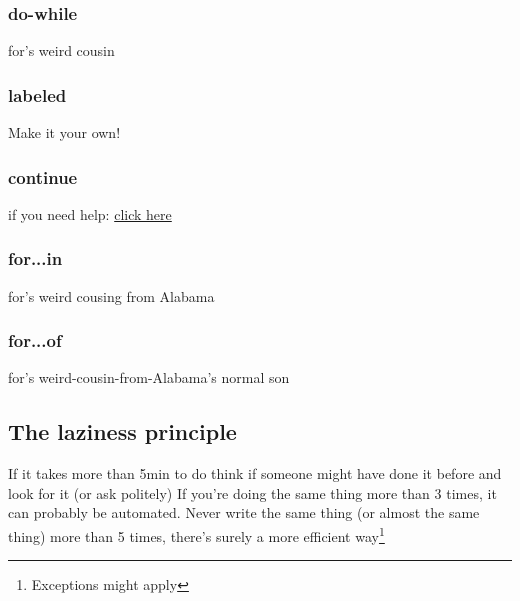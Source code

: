     \subsubsection{do-while}
    \label{subsub:doWhile}
for's weird cousin

    \subsubsection{labeled}
    \label{subsub:labeled}
Make it your own!

    \subsubsection{continue}
    \label{subsub:continue}
if you need help: \href{http://letmegooglethat.com/?q=continue}{click here}

    \subsubsection{for...in}
    \label{subsub:forIn}
for's weird cousing from Alabama

    \subsubsection{for...of}
    \label{subsub:forOf}
for's weird-cousin-from-Alabama's normal son
    
\subsection{The laziness principle}
\label{sub:lazy}
If it takes more than 5min to do think if someone might have done it before and look for it (or ask politely)
If you're doing the same thing more than 3 times, it can probably be automated. Never write the same thing (or almost the same thing) more than 5 times, there's surely a more efficient way\footnote{Exceptions might apply}
